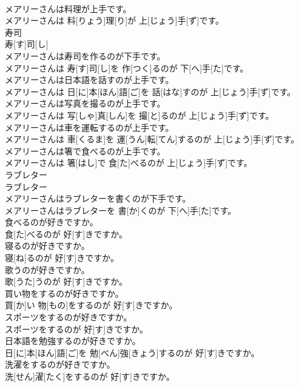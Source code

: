 \documentclass[8pt]{extreport}
\begin{document}
\begin{CJK}{UTF8}{min}
\\	メアリーさんは料理が上手です。	
\\	メアリーさんは 料[りょう]理[り]が 上[じょう]手[ず]です。
\\	寿司	
\\	寿[す]司[し]	
\\	メアリーさんは寿司を作るのが下手です。	
\\	メアリーさんは 寿[す]司[し]を 作[つく]るのが 下[へ]手[た]です。
\\	メアリーさんは日本語を話すのが上手です。	
\\	メアリーさんは 日[に]本[ほん]語[ご]を 話[はな]すのが 上[じょう]手[ず]です。
\\	メアリーさんは写真を撮るのが上手です。	
\\	メアリーさんは 写[しゃ]真[しん]を 撮[と]るのが 上[じょう]手[ず]です。
\\	メアリーさんは車を運転するのが上手です。	
\\	メアリーさんは 車[くるま]を 運[うん]転[てん]するのが 上[じょう]手[ず]です。
\\	メアリーさんは箸で食べるのが上手です。	
\\	メアリーさんは 箸[はし]で 食[た]べるのが 上[じょう]手[ず]です。
\\	ラブレター	
\\	ラブレター
\\	メアリーさんはラブレターを書くのが下手です。	
\\	メアリーさんはラブレターを 書[か]くのが 下[へ]手[た]です。
\\	食べるのが好きですか。	
\\	食[た]べるのが 好[す]きですか。
\\	寝るのが好きですか。	
\\	寝[ね]るのが 好[す]きですか。
\\	歌うのが好きですか。	
\\	歌[うた]うのが 好[す]きですか。
\\	買い物をするのが好きですか。	
\\	買[か]い 物[もの]をするのが 好[す]きですか。
\\	スポーツをするのが好きですか。	
\\	スポーツをするのが 好[す]きですか。
\\	日本語を勉強するのが好きですか。	
\\	日[に]本[ほん]語[ご]を 勉[べん]強[きょう]するのが 好[す]きですか。
\\	洗濯をするのが好きですか。	
\\	洗[せん]濯[たく]をするのが 好[す]きですか。

\end{CJK}
\end{document}
